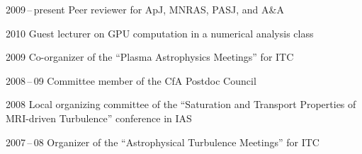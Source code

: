 \begin{tlist}

\item[2009\,--\,present] Peer reviewer for ApJ, MNRAS, PASJ, and A\&A

\item[2010] Guest lecturer on GPU computation in a numerical analysis class

\item[2009] Co-organizer of the ``Plasma Astrophysics Meetings'' for ITC

\item[2008\,--\,09] Committee member of the CfA Postdoc Council

\item[2008] Local organizing committee of the ``Saturation and
  Transport Properties of MRI-driven Turbulence'' conference in IAS

\item[2007\,--\,08] Organizer of the ``Astrophysical Turbulence
  Meetings'' for ITC

\end{tlist}
